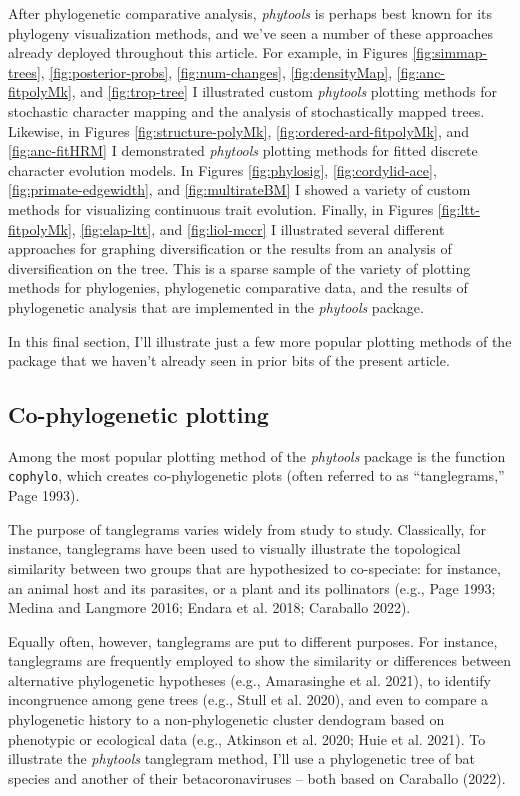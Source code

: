 \documentclass[fleqn,10pt,lineno]{wlpeerj} %
\begin{document}
After phylogenetic comparative analysis, \emph{phytools} is perhaps best known for its phylogeny visualization methods, and we've seen a number of these approaches already deployed throughout this article. For example, in Figures \ref{fig:simmap-trees}, \ref{fig:posterior-probs}, \ref{fig:num-changes}, \ref{fig:densityMap}, \ref{fig:anc-fitpolyMk}, and \ref{fig:trop-tree} I illustrated custom \emph{phytools} plotting methods for stochastic character mapping and the analysis of stochastically mapped trees. Likewise, in Figures \ref{fig:structure-polyMk}, \ref{fig:ordered-ard-fitpolyMk}, and \ref{fig:anc-fitHRM} I demonstrated \emph{phytools} plotting methods for fitted discrete character evolution models. In Figures \ref{fig:phylosig}, \ref{fig:cordylid-ace}, \ref{fig:primate-edgewidth}, and \ref{fig:multirateBM} I showed a variety of custom methods for visualizing continuous trait evolution. Finally, in Figures \ref{fig:ltt-fitpolyMk}, \ref{fig:elap-ltt}, and \ref{fig:liol-mccr} I illustrated several different approaches for graphing diversification or the results from an analysis of diversification on the tree. This is a sparse sample of the variety of plotting methods for phylogenies, phylogenetic comparative data, and the results of phylogenetic analysis that are implemented in the \emph{phytools} package.

In this final section, I'll illustrate just a few more popular plotting methods of the package that we haven't already seen in prior bits of the present article.

\hypertarget{co-phylogenetic-plotting}{%
\subsection{Co-phylogenetic plotting}\label{co-phylogenetic-plotting}}

Among the most popular plotting method of the \emph{phytools} package is the function \texttt{cophylo}, which creates co-phylogenetic plots (often referred to as ``tanglegrams,'' Page 1993).

The purpose of tanglegrams varies widely from study to study. Classically, for instance, tanglegrams have been used to visually illustrate the topological similarity between two groups that are hypothesized to co-speciate: for instance, an animal host and its parasites, or a plant and its pollinators (e.g., Page 1993; Medina and Langmore 2016; Endara et al. 2018; Caraballo 2022).

Equally often, however, tanglegrams are put to different purposes. For instance, tanglegrams are frequently employed to show the similarity or differences between alternative phylogenetic hypotheses (e.g., Amarasinghe et al. 2021), to identify incongruence among gene trees (e.g., Stull et al. 2020), and even to compare a phylogenetic history to a non-phylogenetic cluster dendogram based on phenotypic or ecological data (e.g., Atkinson et al. 2020; Huie et al. 2021). To illustrate the \emph{phytools} tanglegram method, I'll use a phylogenetic tree of bat species and another of their betacoronaviruses -- both based on Caraballo (2022).
\end{document}
